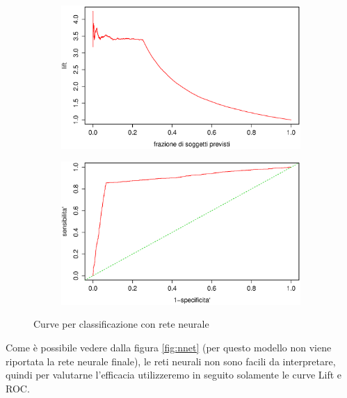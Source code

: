 \begin{figure}[H]
  \begin{subfigure}{0.4\textwidth}
    \includegraphics[width=\columnwidth]{images/class/lift-nnet.eps}
  \end{subfigure}
  \hspace*{\fill}
  \begin{subfigure}{0.4\textwidth}
    \includegraphics[width=\columnwidth]{images/class/roc-nnet.eps}
  \end{subfigure}
  \caption{Curve per classificazione con rete neurale}
  \label{fig:class-nnet}
\end{figure}

Come è possibile vedere dalla figura \ref{fig:nnet} (per questo modello non
viene riportata la rete neurale finale), le reti neurali non sono facili da
interpretare, quindi per valutarne l'efficacia utilizzeremo in seguito
solamente le curve Lift e ROC.


